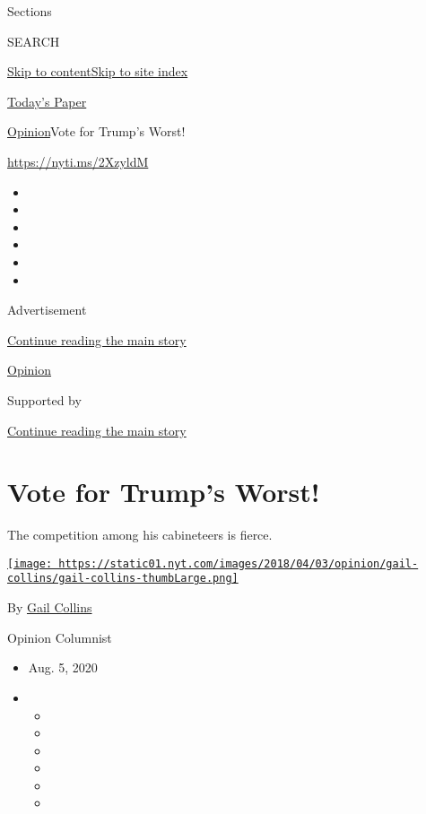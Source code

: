Sections

SEARCH

\protect\hyperlink{site-content}{Skip to
content}\protect\hyperlink{site-index}{Skip to site index}

\href{https://myaccount.nytimes.com/auth/login?response_type=cookie\&client_id=vi}{}

\href{https://www.nytimes.com/section/todayspaper}{Today's Paper}

\href{/section/opinion}{Opinion}\textbar{}Vote for Trump's Worst!

\href{https://nyti.ms/2XzyldM}{https://nyti.ms/2XzyldM}

\begin{itemize}
\item
\item
\item
\item
\item
\item
\end{itemize}

Advertisement

\protect\hyperlink{after-top}{Continue reading the main story}

\href{/section/opinion}{Opinion}

Supported by

\protect\hyperlink{after-sponsor}{Continue reading the main story}

\hypertarget{vote-for-trumps-worst}{%
\section{Vote for Trump's Worst!}\label{vote-for-trumps-worst}}

The competition among his cabineteers is fierce.

\href{https://www.nytimes.com/by/gail-collins}{\texttt{[image: https://static01.nyt.com/images/2018/04/03/opinion/gail-collins/gail-collins-thumbLarge.png]}}

By \href{https://www.nytimes.com/by/gail-collins}{Gail Collins}

Opinion Columnist

\begin{itemize}
\item
  Aug. 5, 2020
\item
  \begin{itemize}
  \item
  \item
  \item
  \item
  \item
  \item
  \end{itemize}
\end{itemize}

